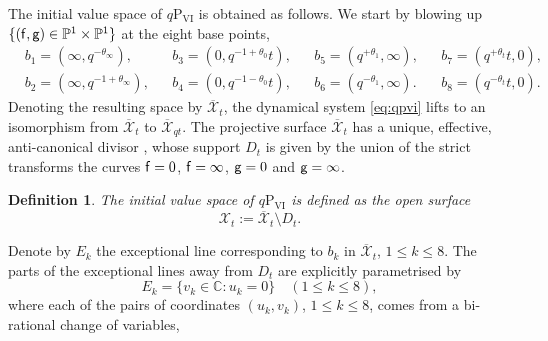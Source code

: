 \documentclass[a4paper,reqno,11pt]{amsart}
\numberwithin{equation}{section}
\numberwithin{figure}{section}
\theoremstyle{plain}
\newtheorem{definition}[theorem]{Definition}
\theoremstyle{remark}
\newcommand\Psix{\textrm{P}_{\textrm{VI}}}
\numberwithin{rhp}{section}
\begin{document}
The initial value space of $q\Psix$ is obtained as follows. We start by blowing up $\{({\sf f}, {\sf g})\in\mathbb P^1\times \mathbb P^1\}$ at the eight base points,
\begin{equation}
    \begin{aligned}
   &b_1=(\infty,q^{-\theta_\infty}), & &b_3=(0,q^{-1+\theta_0}t), & &b_5=(q^{+\theta_1},\infty), & &b_7=(q^{+\theta_t}t,0), \\
  &b_2=(\infty,q^{-1+\theta_\infty}), &  &b_4=(0,q^{-1-\theta_0}t), & &b_6=(q^{-\theta_1},\infty). & &b_8=(q^{-\theta_t}t,0). 
\end{aligned}\label{eq:basepoints}
\end{equation}
Denoting the resulting space by $\overline{\mathcal{X}}_t$, the dynamical system \eqref{eq:qpvi} lifts to an isomorphism from $\overline{\mathcal{X}}_t$ to $\overline{\mathcal{X}}_{qt}$. 
The projective surface $\overline{\mathcal{X}}_t$ has a unique, effective, anti-canonical divisor  \cite{sakai2001}, whose support $D_t$ is given by the union of the strict transforms the curves ${\sf f}=0$, ${\sf f}=\infty$, ${\sf g}=0$ and ${\sf g}=\infty$.
\begin{definition}\label{def:initial_value_space}
  The initial value space of $q\Psix$ is defined as the open surface
\begin{equation*}
    \mathcal{X}_t:=\overline{\mathcal{X}}_t\setminus D_t.
\end{equation*}  
\end{definition}

Denote by $E_k$ the exceptional line corresponding to $b_k$ in $\overline{\mathcal{X}}_t$, $1\leq k\leq 8$. 
The parts of the exceptional lines away from $D_t$ are explicitly parametrised by
\begin{equation}\label{eq:exceptional_para}
    E_k=\{v_k\in\mathbb{C}:u_k=0\}\quad (1\leq k\leq 8),
\end{equation}
where each of the pairs of coordinates $(u_k,v_k)$, $1\leq k\leq 8$, comes from a bi-rational change of variables,
\end{document}
